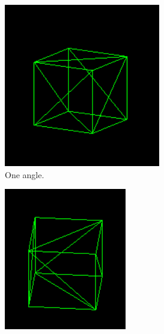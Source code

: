 \documentclass[12pt]{article}
\begin{document}
\begin{figure}[!h]
\centering
    \begin{subfigure}{.5\textwidth}
        \centering
        \includegraphics[width = \textwidth]{figs/ex_22_1.png}
        \caption{One angle.}
        \label{fig:ex_22_1}
    \end{subfigure}%
    \begin{subfigure}{.5\textwidth}
        \centering
        \includegraphics[width = \textwidth]{figs/ex_22_2.png}

\end{subfigure}
\end{figure}
\end{document}
